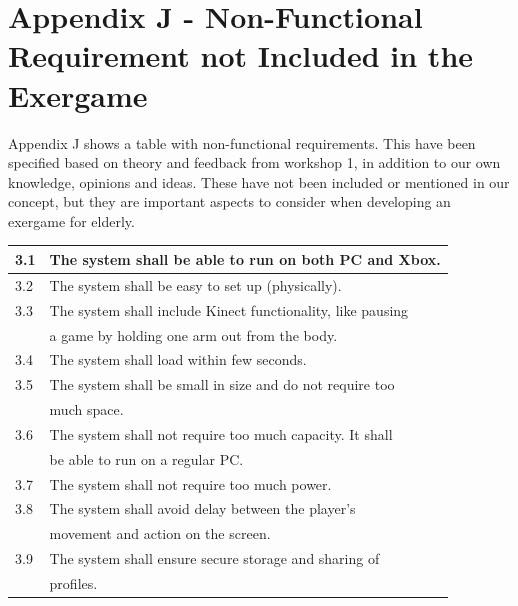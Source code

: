 \section*{Appendix J - Non-Functional Requirement not Included in the Exergame}
Appendix J shows a table with non-functional requirements. This have been specified based on theory and feedback from workshop 1, in addition to our own knowledge, opinions and ideas. These have not been included or mentioned in our concept, but they are important aspects to consider when developing an exergame for elderly.
\begin{table} [H]
\label{tab:nfunc2}
\centering
\begin{tabular}{|l|l|}
\hline
3.1 & The system shall be able to run on both PC and Xbox. \\ \hline
3.2 & The system shall be easy to set up (physically).\\ \hline
3.3 & The system shall include Kinect functionality, like pausing \\ & a game by holding one arm out from the body. \\ \hline
3.4 & The system shall load within few seconds.\\ \hline
3.5 & The system shall be small in size and do not require too \\&  much space.\\ \hline
3.6 & The system shall not require too much capacity. It shall \\ & be able to run on a regular PC. \\ \hline
3.7 & The system shall not require too much power. \\ \hline
3.8 & The system shall avoid delay between the player's \\ & movement and action on the screen.\\ \hline
3.9 & The system shall ensure secure storage and sharing of \\ & profiles. \\ \hline
\end{tabular}
\end{table} 
